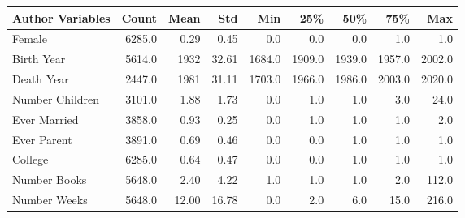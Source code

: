\begin{table}[]
\begin{tabular}{lrrrrrrrr}
\toprule
{} Author Variables &   Count &         Mean &        Std &     Min &     25\% &     50\% &     75\% &     Max \\
\midrule
Female          &  6285.0 &     0.29 &   0.45 &     0.0 &     0.0 &     0.0 &     1.0 &     1.0 \\
Birth Year      &  5614.0 &  1932 &  32.61 &  1684.0 &  1909.0 &  1939.0 &  1957.0 &  2002.0 \\
Death Year      &  2447.0 &  1981 &  31.11 &  1703.0 &  1966.0 &  1986.0 &  2003.0 &  2020.0 \\
Number Children    &  3101.0 &     1.88 &   1.73 &     0.0 &     1.0 &     1.0 &     3.0 &    24.0 \\
Ever Married     &  3858.0 &     0.93 &   0.25 &     0.0 &     1.0 &     1.0 &     1.0 &     2.0 \\
Ever Parent    &  3891.0 &     0.69 &   0.46 &     0.0 &     0.0 &     1.0 &     1.0 &     1.0 \\
College        &  6285.0 &     0.64 &   0.47 &     0.0 &     0.0 &     1.0 &     1.0 &     1.0 \\
Number Books    &  5648.0 &     2.40 &   4.22 &     1.0 &     1.0 &     1.0 &     2.0 &   112.0 \\
Number Weeks &  5648.0 &    12.00 &  16.78 &     0.0 &     2.0 &     6.0 &    15.0 &   216.0 \\
\bottomrule
\end{tabular}
\end{table}
    
    
